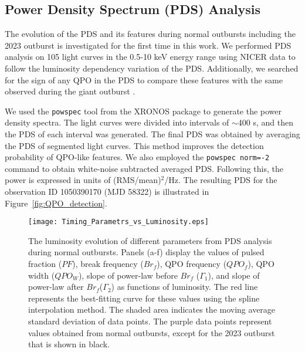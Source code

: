 \documentclass[twocolumn,trackchanges]{aastex631}
\begin{document}
\subsection{Power Density Spectrum (PDS) Analysis}
 
The evolution of the PDS and its features during normal outbursts including the 2023 outburst is investigated for the first time in this work. We performed PDS analysis on 105
light curves in the 0.5-10 keV energy range using NICER data to follow the luminosity dependency variation of the PDS. Additionally, we searched for the sign of any QPO in the PDS to compare these features with the same observed during the giant outburst \citep{2018ApJ...863....9W}.  




 We used the  \texttt{powspec} tool from the XRONOS package to generate the power density spectra.   The light curves were divided into intervals of $\sim$400 s, and then the  PDS of each interval was generated. The final PDS was obtained by averaging the PDS of segmented light curves. This method improves the detection probability of QPO-like features. We also employed the \texttt{powspec norm=-2} command to obtain white-noise subtracted averaged PDS.  Following this, the power is expressed in units of (RMS/mean)$^{2}$/Hz. The resulting PDS for the observation ID 1050390170 (MJD 58322) is illustrated in Figure~\ref{fig:QPO_detection}. 

\begin{figure*}
    \centering
    \texttt{[image: Timing\_Parametrs\_vs\_Luminosity.eps]}
    \caption{ 
    The luminosity evolution of different parameters from PDS analysis during normal outbursts.
    Panels (a-f) display the values of pulsed fraction ($PF$), break frequency ($Br_{f}$), QPO frequency ($QPO_{f}$), QPO width ($QPO_{W}$), slope of power-law before $Br_{f}$ ($\Gamma_1$), and slope of power-law after $Br_{f}$($\Gamma_2$) as functions of luminosity. The red line represents the best-fitting curve for these values using the spline interpolation method. The shaded area indicates the moving average standard deviation of data points. The purple data points represent values obtained from normal outbursts, except for the 2023 outburst that is shown in black. 
    }
    \label{fig:QPO_evolve_L}
\end{figure*}
\end{document}
